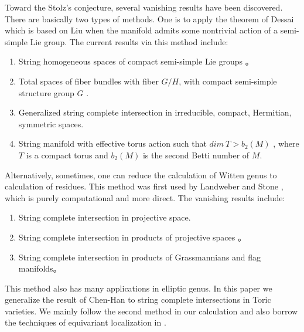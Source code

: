 \documentclass[11pt]{article}
\begin{document}
Toward the Stolz's conjecture, several vanishing results have been discovered. There are basically two types of methods. One is to apply the theorem of Dessai \cite{dessai1994witten} which is based on Liu \cite{liu1995modular} when the manifold admits some nontrivial action of a semi-simple Lie group. The current results via this method include:
\begin{enumerate}
\item String homogeneous spaces of compact semi-simple Lie groups \cite{dessai1994witten,liu1995modular}。
\item Total spaces of fiber bundles with fiber $G/H$, with compact semi-simple structure group $G$ \cite{stolz1996conjecture}.
\item Generalized string complete intersection in irreducible, compact, Hermitian, symmetric spaces\cite{forster2007stolz}.
\item String manifold with effective torus action such that $dim\  T>b_2(M)$ \cite{wiemeler2017note}, where $T$ is a compact torus and $b_2(M)$ is the second Betti number of $M$.
\end{enumerate}

Alternatively, sometimes, one can reduce the calculation of Witten genus to calculation of residues. This method was first used by Landweber and Stone \cite{hirzebruch1992manifolds}, which is purely computational and more direct. The vanishing results include:
\begin{enumerate}
\item String complete intersection in projective space\cite{hirzebruch1992manifolds}.
\item String complete intersection in products of projective spaces \cite{chen2008witten}。
\item String complete intersection in products of Grassmannians and flag manifolds\cite{zhou2014witten,zhuang2016vanishing}。
\end{enumerate}
This method also has many applications in elliptic genus\cite{ma2005elliptic,gorbounov2008mirror}.
In this paper we generalize the result of Chen-Han \cite{chen2008witten} to string complete intersections in Toric varieties. We mainly follow the second method in our calculation and also borrow the techniques of equivariant localization in \cite{dessai2016torus}.
\end{document}
